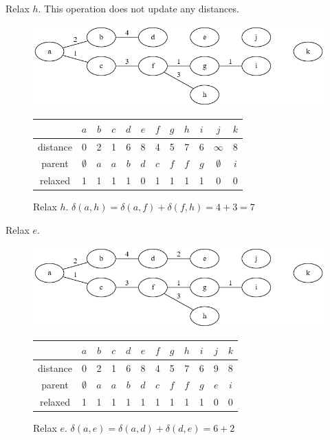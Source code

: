 \documentclass{book}
\begin{document}
Relax $h$. This operation does not update any distances.

\begin{figure}[H]
\centering
\includegraphics[width=.75\textwidth]{ch-dijkstra/spf8}
  \begin{tabular}{ | c | c | c | c | c | c | c | c | c | c | c | c | }
  \hline
   & $a$ & $b$ & $c$ & $d$ & $e$ & $f$ & $g$ & $h$ & $i$ & $j$ & $k$ \\
   \hline
   distance & 0 & 2 & 1 & 6 & 8 & 4 & 5 & 7 & 6 & $\infty$ & 8 \\
   \hline
   parent & $\emptyset$ & $a$ & $a$ & $b$ & $d$ & $c$ & $f$ & $f$ & $g$ & $\emptyset$ & $i$ \\
   \hline
   relaxed & 1 & 1 & 1 & 1 & 0 & 1 & 1 & 1 & 1 & 0 & 0 \\
   \hline
  \end{tabular}
\caption{Relax $h$. $\delta(a,h) = \delta(a,f) + \delta(f,h) = 4+3=7$}
\label{spf8}
\end{figure}

Relax $e$.

\begin{figure}[H]
\centering
\includegraphics[width=.75\textwidth]{ch-dijkstra/spf9}
  \begin{tabular}{ | c | c | c | c | c | c | c | c | c | c | c | c | }
  \hline
   & $a$ & $b$ & $c$ & $d$ & $e$ & $f$ & $g$ & $h$ & $i$ & $j$ & $k$ \\
   \hline
   distance & 0 & 2 & 1 & 6 & 8 & 4 & 5 & 7 & 6 & 9 & 8 \\
   \hline
   parent & $\emptyset$ & $a$ & $a$ & $b$ & $d$ & $c$ & $f$ & $f$ & $g$ & $e$ & $i$ \\
   \hline
   relaxed & 1 & 1 & 1 & 1 & 1 & 1 & 1 & 1 & 1 & 0 & 0 \\
   \hline
  \end{tabular}
\caption{Relax $e$. $\delta(a,e) = \delta(a,d) + \delta(d,e) = 6 + 2$}
\label{spf9}
\end{figure}
\end{document}
